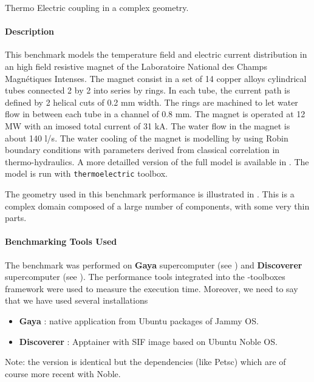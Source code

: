 Thermo Electric coupling in a complex geometry.

\paragraph{Description}

This benchmark models the temperature field and electric current distribution in an high field resistive magnet of the Laboratoire National des Champs Magnétiques Intenses. The magnet consist in a set of 14 copper alloys cylindrical tubes connected 2 by 2 into series by rings. In each tube, the current path is defined by 2 helical cuts of 0.2 mm width. The rings are machined to let water flow in between each tube
in a channel of 0.8 mm. The magnet is operated at 12 MW with an imosed total current of 31 kA. The water flow in the magnet is about 140 l/s. The water cooling of the magnet is modelling by using Robin boundary conditions with parameters derived from classical correlation in thermo-hydraulics.
A more detailled version of the full model is available in \cite{daver2016,Hild2020}. The
model is run with \texttt{thermoelectric} \Feelpp toolbox.

The geometry used in this benchmark performance is illustrated in
. This is a complex domain
composed of a large number of components, with some very thin parts.

\paragraph{Benchmarking Tools Used}
The benchmark was performed on \textbf{Gaya} supercomputer (see ) and \textbf{Discoverer} supercomputer (see
).
The performance tools integrated into the \Feelpp-toolboxes framework were used to measure
the execution time.
Moreover, we need to say that we have used several \Feelpp installations
\begin{itemize}
\item \textbf{Gaya} : native application from Ubuntu packages of Jammy OS.
\item \textbf{Discoverer} : Apptainer with \Feelpp SIF image based on Ubuntu
  Noble OS.
\end{itemize}
Note: the \Feelpp version is identical but the dependencies (like Petsc)
which are of course more recent with Noble.

